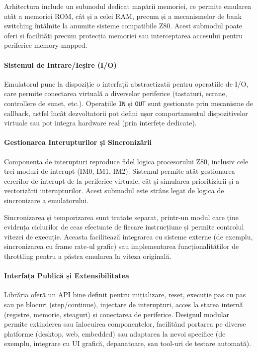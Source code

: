 \documentclass[titlepage,12pt]{article}
\begin{document}
Arhitectura include un submodul dedicat mapării memoriei, ce permite emularea atât a memoriei ROM, cât și a celei RAM, precum și a mecanismelor de bank switching întâlnite la anumite sisteme compatibile Z80. Acest submodul poate oferi și facilități precum protecția memoriei sau interceptarea accesului pentru periferice memory-mapped.

\paragraph{Sistemul de Intrare/Ieșire (I/O)}

Emulatorul pune la dispoziție o interfață abstractizată pentru operațiile de I/O, care permite conectarea virtuală a diverselor periferice (tastaturi, ecrane, controllere de sunet, etc.). Operațiile \texttt{IN} și \texttt{OUT} sunt gestionate prin mecanisme de callback, astfel încât dezvoltatorii pot defini ușor comportamentul dispozitivelor virtuale sau pot integra hardware real (prin interfețe dedicate).

\paragraph{Gestionarea Interupturilor și Sincronizării}

Componenta de interupturi reproduce fidel logica procesorului Z80, inclusiv cele trei moduri de interupt (IM0, IM1, IM2). Sistemul permite atât gestionarea cererilor de interupt de la periferice virtuale, cât și simularea prioritizării și a vectorizării interupturilor. Acest submodul este strâns legat de logica de sincronizare a emulatorului.

Sincronizarea și temporizarea sunt tratate separat, printr-un modul care ține evidența ciclurilor de ceas efectuate de fiecare instrucțiune și permite controlul vitezei de execuție. Aceasta facilitează integrarea cu sisteme externe (de exemplu, sincronizarea cu frame rate-ul grafic) sau implementarea funcționalităților de throttling pentru a păstra emularea la viteza originală.

\paragraph{Interfața Publică și Extensibilitatea}

Librăria oferă un API bine definit pentru inițializare, reset, execuție pas cu pas sau pe blocuri (step/continue), injectare de interupturi, acces la starea internă (registre, memorie, steaguri) și conectarea de periferice. Designul modular permite extinderea sau înlocuirea componentelor, facilitând portarea pe diverse platforme (desktop, web, embedded) sau adaptarea la nevoi specifice (de exemplu, integrare cu UI grafică, depanatoare, sau tool-uri de testare automată).
\end{document}
